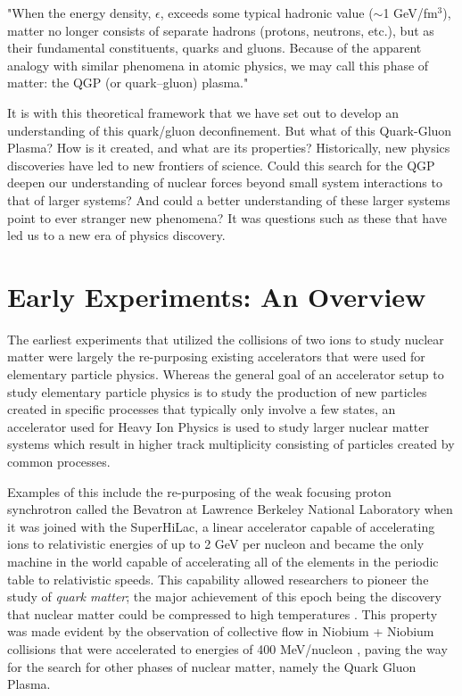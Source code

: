 \begin{addmargin}[1.5em]{2em}
"When the energy density, $\epsilon$, exceeds some typical hadronic value ($\sim$1 GeV/fm$^{3}$), matter no longer consists of separate hadrons (protons, neutrons, etc.), but as their fundamental constituents, quarks and gluons. Because of the apparent analogy with similar phenomena in atomic physics, we may call this phase of matter: the QGP (or quark–gluon) plasma."
\end{addmargin}
 
It is with this theoretical framework that we have set out to develop an understanding of this quark/gluon deconfinement. But what of this Quark-Gluon Plasma? How is it created, and what are its properties? Historically, new physics discoveries have led to new frontiers of science. Could this search for the QGP deepen our understanding of nuclear forces beyond small system interactions to that of larger systems? And could a better understanding of these larger systems point to ever stranger new phenomena? It was questions such as these that have led us to a new era of physics discovery.

\section{Early Experiments: An Overview}
The earliest experiments that utilized the collisions of two ions to study nuclear matter were largely the re-purposing existing accelerators that were used for elementary particle physics. Whereas the general goal of an accelerator setup to study elementary particle physics is to study the production of new particles created in specific processes that typically only involve a few states, an accelerator used for Heavy Ion Physics is used to study larger nuclear matter systems which result in higher track multiplicity consisting of particles created by common processes. 

Examples of this include the re-purposing of the weak focusing proton synchrotron called the Bevatron at Lawrence Berkeley National Laboratory when it was joined with the SuperHiLac, a linear accelerator capable of accelerating ions to relativistic energies of up to 2 GeV per nucleon and became the only machine in the world capable of accelerating all of the elements in the periodic table to relativistic speeds. This capability allowed researchers to pioneer the study of \textit{quark matter}\citep{bevalac9lives}; the major achievement of this epoch being the discovery that nuclear matter could be compressed to high temperatures \citep{ROBINSON857}. This property was made evident by the observation of collective flow in Niobium + Niobium collisions that were accelerated to energies of 400 MeV/nucleon \citep{PhysRevLett.52.1590}, paving the way for the search for other phases of nuclear matter, namely the Quark Gluon Plasma.

